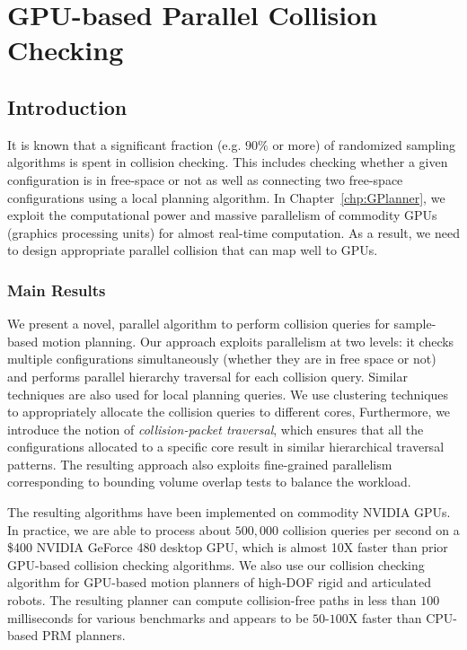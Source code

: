 \chapter{GPU-based Parallel Collision Checking} 
\label{chp:GCollide}


\section{Introduction}
It is known that a significant fraction (e.g. $90\%$ or more) of randomized sampling algorithms is
spent in collision checking. This includes checking whether a given configuration is in free-space or not
as well as connecting two free-space configurations using a local planning algorithm. In Chapter~\ref{chp:GPlanner}, we exploit the computational power and massive parallelism of commodity GPUs (graphics processing units) for almost real-time
computation. As a result, we need to design appropriate parallel collision that can map well to GPUs.

\subsection{Main Results}
We present a novel, parallel algorithm to perform collision queries for sample-based
motion planning. Our approach exploits parallelism at two levels: it checks multiple configurations simultaneously (whether they are in free space or not) and performs parallel hierarchy traversal for each collision query.
Similar techniques are also used for local planning queries. We use clustering techniques to appropriately
allocate the collision queries to different cores, Furthermore, we introduce the notion of \emph{collision-packet traversal},
which ensures that all the configurations allocated to a specific core result in similar hierarchical traversal
patterns. The resulting approach also exploits fine-grained parallelism corresponding to bounding volume overlap tests
to balance the workload.

The resulting algorithms have been implemented on commodity NVIDIA GPUs. In practice, we are able to process about
$500,000$ collision queries per second on a \$400 NVIDIA GeForce 480 desktop GPU, which is almost 10X faster than prior GPU-based collision checking algorithms. We also use our collision checking algorithm for GPU-based motion planners of high-DOF
rigid and articulated robots.
The resulting planner can compute collision-free paths in less than $100$ milliseconds for various benchmarks and
appears to be $50\text{-}100$X faster than CPU-based PRM planners.

